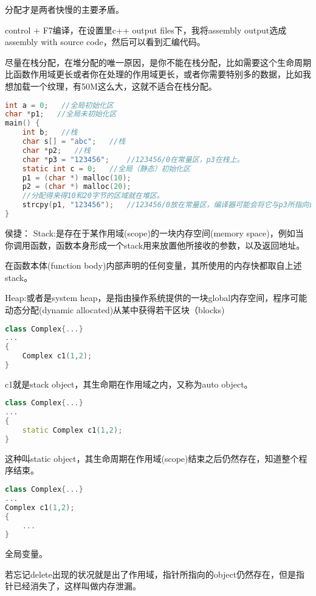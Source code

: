 分配才是两者快慢的主要矛盾。

control + F7编译，在设置里c++ output files下，我将assembly output选成assembly with source code，然后可以看到汇编代码。

尽量在栈分配，在堆分配的唯一原因，是你不能在栈分配，比如需要这个生命周期比函数作用域更长或者你在处理的作用域更长，或者你需要特别多的数据，比如我想加载一个纹理，有50M这么大，这就不适合在栈分配。

\begin{lstlisting}[language=c]
int a = 0;   //全局初始化区
char *p1;   //全局未初始化区
main() {
    int b;   //栈
    char s[] = "abc";   //栈
    char *p2;   //栈
    char *p3 = "123456";    //123456/0在常量区，p3在栈上。
    static int c = 0;   //全局（静态）初始化区
    p1 = (char *) malloc(10);
    p2 = (char *) malloc(20);
    //分配得来得10和20字节的区域就在堆区。
    strcpy(p1, "123456");   //123456/0放在常量区，编译器可能会将它与p3所指向的"123456"优化成一个地方
}
\end{lstlisting}

侯捷：
Stack:是存在于某作用域(scope)的一块内存空间(memory space)，例如当你调用函数，函数本身形成一个stack用来放置他所接收的参数，以及返回地址。

在函数本体(function body)内部声明的任何变量，其所使用的内存快都取自上述stack。

Heap:或者是system heap，是指由操作系统提供的一块global内存空间，程序可能动态分配(dynamic allocated)从某中获得若干区块（blocks) 


\begin{lstlisting}[language=c++]
class Complex{...}
...
{
    Complex c1(1,2);
}
\end{lstlisting}

c1就是stack object，其生命期在作用域之内，又称为auto object。


\begin{lstlisting}[language=c++]
class Complex{...}
...
{
    static Complex c1(1,2);
}
\end{lstlisting}

这种叫static object，其生命周期在作用域(scope)结束之后仍然存在，知道整个程序结束。


\begin{lstlisting}[language=c++]
class Complex{...}
...
Complex c1(1,2);
{
    ...
}
\end{lstlisting}

全局变量。

若忘记delete出现的状况就是出了作用域，指针所指向的object仍然存在，但是指针已经消失了，这样叫做内存泄漏。


